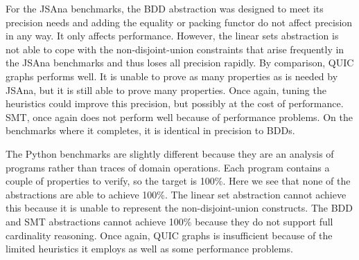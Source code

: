 For the JSAna benchmarks, the BDD abstraction was designed to meet its precision needs and adding the equality or packing functor do not affect precision in any way.  It only affects performance.  However, the linear sets abstraction is not able to cope with the non-disjoint-union constraints that arise frequently in the JSAna benchmarks and thus loses all precision rapidly.  By comparison, QUIC graphs performs well.  It is unable to prove as many properties as is needed by JSAna, but it is still able to prove many properties.  Once again, tuning the heuristics could improve this precision, but possibly at the cost of performance.  SMT, once again does not perform well because of performance problems.  On the benchmarks where it completes, it is identical in precision to BDDs.

The Python benchmarks are slightly different because they are an analysis of programs rather than traces of domain operations.  Each program contains a couple of properties to verify, so the target is 100\%.  Here we see that none of the abstractions are able to achieve 100\%.  The linear set abstraction cannot achieve this because it is unable to represent the non-disjoint-union constructs.  The BDD and SMT abstractions cannot achieve 100\% because they do not support full cardinality reasoning.  Once again, QUIC graphs is insufficient because of the limited heuristics it employs as well as some performance problems.

